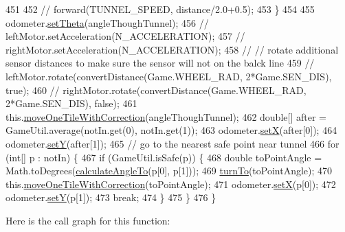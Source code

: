 \begin{DoxyCode}
451 
452       \textcolor{comment}{// forward(TUNNEL\_SPEED, distance/2.0+0.5);}
453     \}
454 
455     odometer.\hyperlink{classca_1_1mcgill_1_1ecse211_1_1odometer_1_1_odometer_data_a419b8f07c2c5374411c8e62298e9a402}{setTheta}(angleThoughTunnel);
456     \textcolor{comment}{// leftMotor.setAcceleration(N\_ACCELERATION);}
457     \textcolor{comment}{// rightMotor.setAcceleration(N\_ACCELERATION);}
458     \textcolor{comment}{// // rotate additional sensor distances to make sure the sensor will not on the balck line}
459     \textcolor{comment}{// leftMotor.rotate(convertDistance(Game.WHEEL\_RAD, 2*Game.SEN\_DIS), true);}
460     \textcolor{comment}{// rightMotor.rotate(convertDistance(Game.WHEEL\_RAD, 2*Game.SEN\_DIS), false);}
461     this.\hyperlink{classca_1_1mcgill_1_1ecse211_1_1project_1_1_navigation_afbe677941e2bd44e35452e1eff508ae9}{moveOneTileWithCorrection}(angleThoughTunnel);
462     \textcolor{keywordtype}{double}[] after = GameUtil.average(notIn.get(0), notIn.get(1));
463     odometer.\hyperlink{classca_1_1mcgill_1_1ecse211_1_1odometer_1_1_odometer_data_a2911d7215e47f3064defe016b46bfeef}{setX}(after[0]);
464     odometer.\hyperlink{classca_1_1mcgill_1_1ecse211_1_1odometer_1_1_odometer_data_a82986438cd462e66520bc62bb4bd2b75}{setY}(after[1]);
465     \textcolor{comment}{// go to the nearest safe point near tunnel}
466     \textcolor{keywordflow}{for} (\textcolor{keywordtype}{int}[] p : notIn) \{
467       \textcolor{keywordflow}{if} (GameUtil.isSafe(p)) \{
468         \textcolor{keywordtype}{double} toPointAngle = Math.toDegrees(\hyperlink{classca_1_1mcgill_1_1ecse211_1_1project_1_1_navigation_a4376e54162df8f123ca3b52e4fd2f38d}{calculateAngleTo}(p[0], p[1]));
469         \hyperlink{classca_1_1mcgill_1_1ecse211_1_1project_1_1_navigation_a3bbe0645f2b3b3d0986b4a707fb5a00c}{turnTo}(toPointAngle);
470         this.\hyperlink{classca_1_1mcgill_1_1ecse211_1_1project_1_1_navigation_afbe677941e2bd44e35452e1eff508ae9}{moveOneTileWithCorrection}(toPointAngle);
471         odometer.\hyperlink{classca_1_1mcgill_1_1ecse211_1_1odometer_1_1_odometer_data_a2911d7215e47f3064defe016b46bfeef}{setX}(p[0]);
472         odometer.\hyperlink{classca_1_1mcgill_1_1ecse211_1_1odometer_1_1_odometer_data_a82986438cd462e66520bc62bb4bd2b75}{setY}(p[1]);
473         \textcolor{keywordflow}{break};
474       \}
475     \}
476   \}
\end{DoxyCode}
Here is the call graph for this function\+:\nopagebreak
